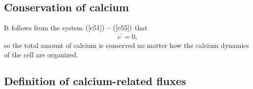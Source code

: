 

\subsection{Conservation of calcium}

It follows from the system $\left(  \ref{c51})-(\ref{c55}\right)  $ that%
\begin{equation}
c^{\prime}=0,
\end{equation}
so the total amount of calcium is conserved no matter how the calcium
dynamics of the cell are organized. 



\subsection{Definition of calcium-related fluxes}

